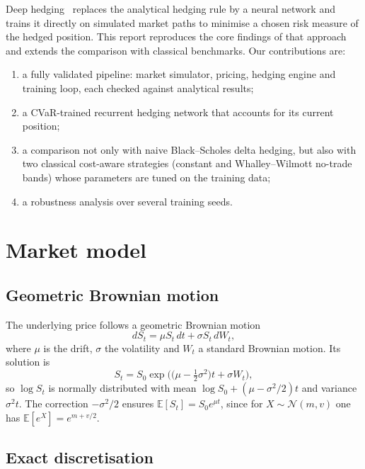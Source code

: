 \documentclass[11pt,a4paper]{article}
\newcommand{\E}{\mathbb{E}}
\begin{document}
Deep hedging~\cite{buehler2019} replaces the analytical hedging rule by a neural network and
trains it directly on simulated market paths to minimise a chosen risk measure of the hedged
position. This report reproduces the core findings of that approach and extends the comparison
with classical benchmarks. Our contributions are:
\begin{enumerate}
  \item a fully validated pipeline: market simulator, pricing, hedging engine and training loop,
        each checked against analytical results;
  \item a CVaR-trained recurrent hedging network that accounts for its current position;
  \item a comparison not only with naive Black--Scholes delta hedging, but also with two
        classical cost-aware strategies (constant and Whalley--Wilmott no-trade bands) whose
        parameters are tuned on the training data;
  \item a robustness analysis over several training seeds.
\end{enumerate}

\section{Market model}

\subsection{Geometric Brownian motion}

The underlying price follows a geometric Brownian motion
\begin{equation}
  dS_t = \mu S_t\,dt + \sigma S_t\,dW_t ,
\end{equation}
where $\mu$ is the drift, $\sigma$ the volatility and $W_t$ a standard Brownian motion.
Its solution is
\begin{equation}
  S_t = S_0 \exp\!\Big( \big(\mu - \tfrac{1}{2}\sigma^2\big) t + \sigma W_t \Big),
\end{equation}
so $\log S_t$ is normally distributed with mean $\log S_0 + (\mu - \sigma^2/2)t$ and variance
$\sigma^2 t$. The correction $-\sigma^2/2$ ensures $\E[S_t] = S_0 e^{\mu t}$, since for
$X \sim \mathcal{N}(m, v)$ one has $\E[e^X] = e^{m + v/2}$.

\subsection{Exact discretisation}
\end{document}
